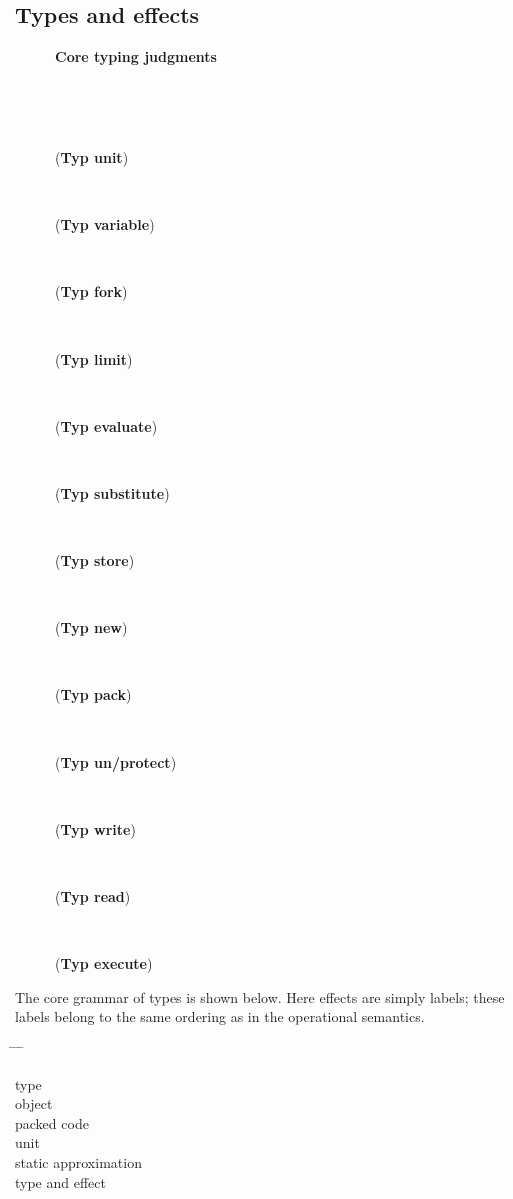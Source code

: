 \documentclass{sigplanconf}
\newenvironment{defn}{\begin{tabbing}
  \hspace{1.5em} \= \hspace{.20\linewidth - 1.5em} \= \hspace{1.5em} \= \kill
  }{
  \end{tabbing}}
\def\upbracketfill{}
\def\downbracketfill{}
\newcommand{\cenvvv}[3]{\vspace{0.8mm}
\begin{flushleft}
\parbox{8.4cm}{{\bf #1} }
\\
\parbox{8.4cm}{\downbracketfill}
\\
\vspace{-0.2cm}
\end{flushleft}
#3
\begin{flushleft}
\parbox{8.4cm}{\upbracketfill}
\end{flushleft}}
\newcommand{\entry}[2]{\>\>\>#2}
\newcommand{\clause}[2]{\>\>#2}
\newcommand{\mycategory}[2]{\clause{#1::=}{#2}}
\newcommand{\labp}{\mathsf P}
\newcommand{\labt}{\mathsf E}
\begin{document}
\subsection{Types and effects}
\begin{figure}
\cenvvv{Core typing judgments}{\Gamma \vdash_{\labp} a : T}{
({\bf Typ unit})\vspace{-1mm}

~

({\bf Typ variable})\vspace{-1mm}

~

({\bf Typ fork})\vspace{-0mm}

~

({\bf Typ limit})\vspace{-1mm}

~

({\bf Typ evaluate})\vspace{1mm}

~

({\bf Typ substitute})\vspace{1mm}

~

({\bf Typ store})\vspace{1mm}

~

({\bf Typ new})\vspace{-1mm}

~

({\bf Typ pack})\vspace{-0mm}

~

({\bf Typ un/protect})\vspace{1mm}

~

({\bf Typ write})\vspace{1mm}

~

({\bf Typ read})\vspace{1mm}

~

({\bf Typ execute})\vspace{1mm}

}
\end{figure}
The core grammar of types is shown below. Here effects are simply labels; these labels belong to the same ordering  as in the operational semantics. \begin{defn}
\mycategory{\tau}{type}\\
\entry{\mathbf{Obj}(T)}{object} \\
\entry{\nabla_{\labp}.~\mathbf{Bin}(T)}{packed code} \\
\entry{\mathbf{Unit}}{unit} \\
\mycategory{T}{static approximation}\\
\entry{\tau^\labt}{type and effect}
\end{defn}
\end{document}
